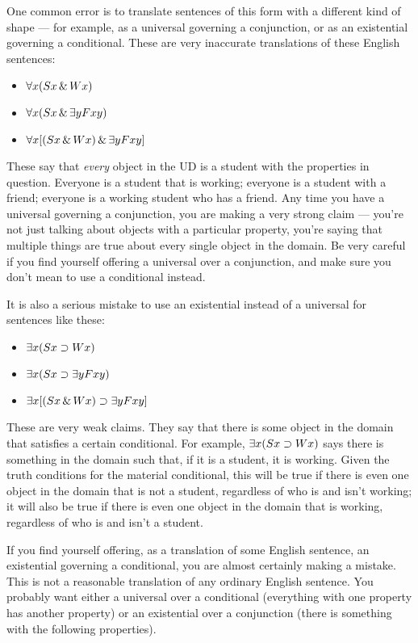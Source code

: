 One common error is to translate sentences of this form with a different kind of shape --- for example, as a universal governing a conjunction, or as an existential governing a conditional. These are very inaccurate translations of these English sentences:

\begin{itemize}
\item $\forall x (Sx \,\&\, Wx)$
\item $\forall x (Sx \,\&\, \exists y Fxy)$
\item $\forall x [(Sx \,\&\, Wx) \,\&\, \exists y Fxy]$
\end{itemize}

These say that \emph{every} object in the UD is a student with the properties in question. Everyone is a student that is working; everyone is a student with a friend; everyone is a working student who has a friend. Any time you have a universal governing a conjunction, you are making a very strong claim --- you're not just talking about objects with a particular property, you're saying that multiple things are true about every single object in the domain. Be very careful if you find yourself offering a universal over a conjunction, and make sure you don't mean to use a conditional instead.

It is also a serious mistake to use an existential instead of a universal for sentences like these:

\begin{itemize}
\item $\exists x (Sx \supset Wx)$
\item $\exists x (Sx \supset \exists y Fxy)$
\item $\exists x [(Sx \,\&\, Wx) \supset \exists y Fxy]$
\end{itemize}

These are very weak claims. They say that there is some object in the domain that satisfies a certain conditional. For example, $\exists x (Sx \supset Wx)$ says there is something in the domain such that, if it is a student, it is working. Given the truth conditions for the material conditional, this will be true if there is even one object in the domain that is not a student, regardless of who is and isn't working; it will also be true if there is even one object in the domain that is working, regardless of who is and isn't a student.

If you find yourself offering, as a translation of some English sentence, an existential governing a conditional, you are almost certainly making a mistake. This is not a reasonable translation of any ordinary English sentence. You probably want either a universal over a conditional (everything with one property has another property) or an existential over a conjunction (there is something with the following properties). 

